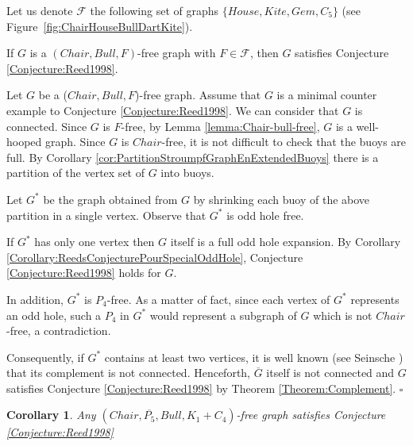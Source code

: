 \documentclass{amsart}
\newtheorem{cor}[thm]{Corollary}
\theoremstyle{definition}
\theoremstyle{remark}
\newenvironment{prf}{{\bf \noindent Proof. } }{\hfill$\square$\\}
\newcommand{\wh}{well-hooped\xspace}
\newcommand{\extB}{buoy\xspace}
\newcommand{\extBs}{buoys\xspace}
\begin{document}
Let us denote $\mathcal{F}$ the following set of graphs $\{House,Kite, Gem, C_5\}$ (see Figure~\ref{fig:ChairHouseBullDartKite}).

 \begin{thm} \label{Theorem:Bull_House_Chair}  If $G$ is a $(Chair, Bull, F)$-free graph with $F\in\mathcal{F}$, then $G$ satisfies Conjecture \ref{Conjecture:Reed1998}.
\end{thm}
\begin{prf}
Let $G$ be a ($Chair, Bull, F$)-free graph. Assume that $G$ is a minimal counter example to Conjecture \ref{Conjecture:Reed1998}.
We can consider that $G$ is connected. 
Since $G$ is $F$-free, by Lemma \ref{lemma:Chair-bull-free}, $G$ is a \wh graph. Since $G$ is $Chair$-free, it is not difficult to check that the \extBs are full.
By Corollary \ref{cor:PartitionStroumpfGraphEnExtendedBuoys} there is a partition of the vertex set of $G$ into \extBs.

Let $G^{*}$ be the graph obtained from $G$ by shrinking each \extB of the above partition in a single vertex. Observe that $G^*$ is  odd hole free.

If $G^{*}$ has only one vertex then $G$ itself is a full odd hole expansion. By Corollary \ref{Corollary:ReedsConjecturePourSpecialOddHole}, Conjecture \ref{Conjecture:Reed1998} holds for $G$.

In addition, $G^{*}$ is $P_{4}$-free. As a matter of fact, since each vertex of $G^{*}$ represents an odd hole, such a $P_4$ in $G^{*}$ would represent a subgraph of $G$ which is not $Chair$-free, a contradiction.

Consequently, if $G^{*}$ contains at least two vertices, it is well known (see Seinsche \cite{Sei1974}) that its complement
is not connected.  Henceforth, $\overline{G}$ itself is not connected and $G$ satisfies Conjecture \ref{Conjecture:Reed1998} by Theorem \ref{Theorem:Complement}.
\end{prf}

\begin{cor}  \cite{AraKarSub2011} Any $(Chair, \overline{P_{5}}, Bull, K_{1}+C_{4})$-free graph satisfies Conjecture \ref{Conjecture:Reed1998}
\end{cor}





\end{document}
